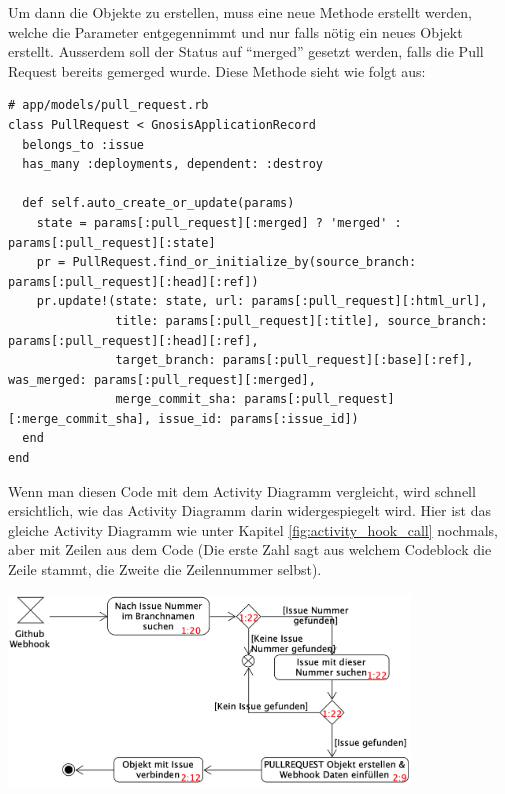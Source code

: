Um dann die Objekte zu erstellen, muss eine neue Methode erstellt werden, welche die Parameter entgegennimmt und nur
falls nötig ein neues Objekt erstellt. Ausserdem soll der Status auf \enquote{merged} gesetzt werden, falls die Pull
Request bereits gemerged wurde. Diese Methode sieht wie folgt aus:
\begin{codebox}[]
  \begin{verbatim}
# app/models/pull_request.rb
class PullRequest < GnosisApplicationRecord
  belongs_to :issue
  has_many :deployments, dependent: :destroy

  def self.auto_create_or_update(params)
    state = params[:pull_request][:merged] ? 'merged' : params[:pull_request][:state]
    pr = PullRequest.find_or_initialize_by(source_branch: params[:pull_request][:head][:ref])
    pr.update!(state: state, url: params[:pull_request][:html_url],
               title: params[:pull_request][:title], source_branch: params[:pull_request][:head][:ref],
               target_branch: params[:pull_request][:base][:ref], was_merged: params[:pull_request][:merged],
               merge_commit_sha: params[:pull_request][:merge_commit_sha], issue_id: params[:issue_id])
  end
end
  \end{verbatim}
\end{codebox}
Wenn man diesen Code mit dem Activity Diagramm vergleicht, wird schnell ersichtlich, wie das Activity Diagramm darin
widergespiegelt wird. Hier ist das gleiche Activity Diagramm wie unter Kapitel \ref{fig:activity_hook_call} nochmals,
aber mit Zeilen aus dem Code (Die erste Zahl sagt aus welchem Codeblock die Zeile stammt, die Zweite die Zeilennummer
selbst).
\begin{center}
  \includegraphics[width=0.8\textwidth]{images/activity/pr_webhook_lines.png}
  \label{fig:activity_diagram_pr_webhook_lines}
\end{center}


